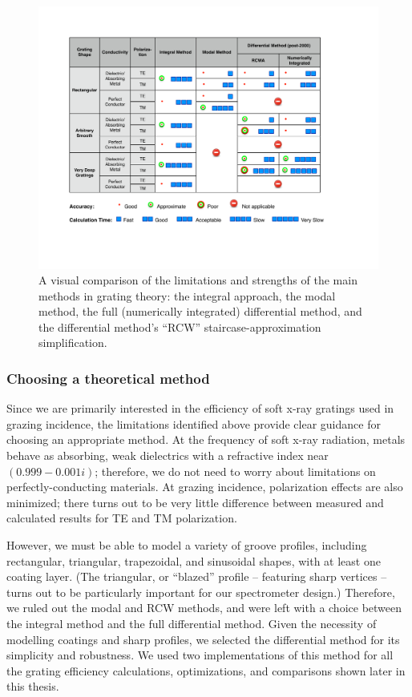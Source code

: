 \begin{figure}[htbp] %
   \centering
   \includegraphics[scale=0.8]{../data/Chapter2/2e_methodComparision/methodComparisonTable_noPre2000.pdf} 
   \caption[A visual comparison of the limitations and strengths of the main methods in grating theory.]{A visual comparison of the limitations and strengths of the main methods in grating theory: the integral approach, the modal method, the full (numerically integrated) differential method, and the differential method's ``RCW'' staircase-approximation simplification.}
   \label{2e}
\end{figure}
 

\subsubsection{Choosing a theoretical method}
Since we are primarily interested in the efficiency of soft x-ray gratings used in grazing incidence, the limitations identified above provide clear guidance for choosing an appropriate method.  At the frequency of soft x-ray radiation, metals behave as absorbing, weak dielectrics with a refractive index near $(0.999 - 0.001i)$; therefore, we do not need to worry about limitations on perfectly-conducting materials.  At grazing incidence, polarization effects are also minimized; there turns out to be very little difference between measured and calculated results for TE and TM polarization.

However, we must be able to model a variety of groove profiles, including rectangular, triangular, trapezoidal, and sinusoidal shapes, with at least one coating layer.  (The triangular, or ``blazed'' profile -- featuring sharp vertices -- turns out to be particularly important for our spectrometer design.)  Therefore, we ruled out the modal and RCW methods, and were left with a choice between the integral method and the full differential method.    Given the necessity of modelling coatings and sharp profiles, we selected the differential method for its simplicity and robustness.  We used two implementations of this method for all the grating efficiency calculations, optimizations, and comparisons shown later in this thesis.

